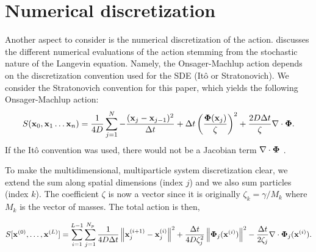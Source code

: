 \section{Numerical discretization}
Another aspect to consider is the numerical discretization of the action. \cite{Adib2008} discusses the different numerical evaluations of the action stemming from the stochastic nature of the Langevin equation. Namely, the Onsager-Machlup action depends on the discretization convention used for the SDE (It\^{o} or Stratonovich). We consider the Stratonovich convention for this paper, which yields the following Onsager-Machlup action: 
\begin{equation}
    S(\mathbf{x}_0, \mathbf{x}_1 \dots \mathbf{x}_n) = \frac{1}{4D} \sum_{j=1}^{N} - \frac{(\mathbf{x}_j - \mathbf{x}_{j-1})^2}{\Delta t} + \Delta t\left(\frac{\mathbf{\Phi}(\mathbf{x}_j)}{\zeta}\right)^2 + \frac{2D\Delta t}{\zeta} \nabla \cdot \mathbf{\Phi}.
\end{equation}
If the It\^{o} convention was used, there would not be a Jacobian term $\nabla \cdot \mathbf{\Phi}$ \cite{cugliandolo2017rules}.

To make the multidimensional, multiparticle system discretization clear, we extend the sum along spatial dimensions (index $j$) and we also sum particles (index $k$). The coefficient $\zeta$ is now a vector since it is originally $\zeta_k = \gamma/M_k$ where $M_k$ is the vector of masses. The total action is then,

\begin{equation}
\begin{split}
\label{eq:diffusion_action}
    S[\mathbf{x}^{(0)}, \dots, \mathbf{x}^{(L)}] = \sum_{i=1}^{L-1} \sum_{j=1}^{N_{p}} \frac{1}{4D \Delta t}\left\|\mathbf{x}^{(i+1)}_{j} - \mathbf{x}^{(i)}_{j} \right\|^2  + \frac{\Delta t}{4D\zeta_j^2} \left\|{\mathbf{\Phi}}_j(\mathbf{x}^{(i)})\right\|^2  - \frac{\Delta t}{2\zeta_j}\nabla \cdot {\mathbf{\Phi}}_j(\mathbf{x}^{(i)}).
\end{split}
\end{equation}


